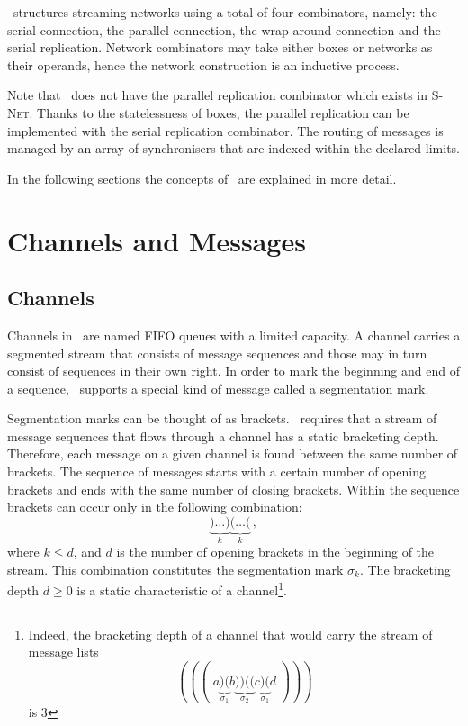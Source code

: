 \ak\ structures streaming networks using a total of four combinators, namely: the serial connection, the parallel connection, the wrap-around connection and the serial replication. Network combinators may take either boxes or networks as their operands, hence the network construction is an inductive process. 

Note that \ak\ does not have the parallel replication combinator which exists in \textsc{S-Net}. Thanks to the statelessness of boxes, the parallel replication can be implemented with the serial replication combinator. The routing of messages is managed by an array of synchronisers that are indexed within the declared limits.

In the following sections the concepts of \ak\ are explained in more detail.


\section{Channels and Messages}
    \subsection*{Channels}
Channels in \ak\ are named FIFO queues with a limited capacity. A channel carries a segmented stream that consists of message sequences and those may in turn consist of sequences in their own right. In order to mark the beginning and end of a sequence, \ak\ supports a special kind of message called a segmentation mark.

Segmentation marks can be thought of as brackets. \ak\ requires that a stream of message sequences that flows through a channel has a static bracketing depth. Therefore, each message on a given channel is found between the same number of brackets. The sequence of messages starts with a certain number of opening brackets and ends with the same number of closing brackets. Within the sequence brackets can occur only in the following combination:
\[
\underbrace{)\ldots)}_k \underbrace{(\ldots(}_k\,,
\]
where $k \le d$, and $d$ is the number of opening brackets in the beginning of the stream. This combination constitutes the segmentation mark $\sigma_k$. The bracketing depth $d \ge 0$ is a static characteristic of a channel\footnote{Indeed, the bracketing depth of a channel that would carry the stream of message lists
\[
(((\;a\underbrace{)(}_{\sigma_1}b\underbrace{))((}_{\sigma_2}c\underbrace{)(}_{\sigma_1}d\;)))
\]
is 3}.

